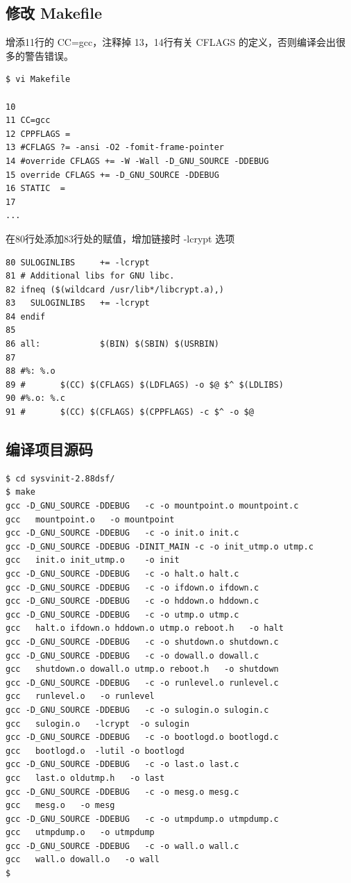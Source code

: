 \subsection{修改 Makefile}

增添11行的 CC=gcc，注释掉 13，14行有关 CFLAGS
的定义，否则编译会出很多的警告错误。

{\begin{shaded}\begin{verbatim}
$ vi Makefile 

10 
11 CC=gcc
12 CPPFLAGS =
13 #CFLAGS ?= -ansi -O2 -fomit-frame-pointer
14 #override CFLAGS += -W -Wall -D_GNU_SOURCE -DDEBUG
15 override CFLAGS += -D_GNU_SOURCE -DDEBUG
16 STATIC  =
17 
...
\end{verbatim}\end{shaded}}
在80行处添加83行处的赋值，增加链接时 -lcrypt 选项

{\begin{shaded}\begin{verbatim}
80 SULOGINLIBS     += -lcrypt
81 # Additional libs for GNU libc.
82 ifneq ($(wildcard /usr/lib*/libcrypt.a),)
83   SULOGINLIBS   += -lcrypt
84 endif
85 
86 all:            $(BIN) $(SBIN) $(USRBIN)
87 
88 #%: %.o
89 #       $(CC) $(CFLAGS) $(LDFLAGS) -o $@ $^ $(LDLIBS)
90 #%.o: %.c
91 #       $(CC) $(CFLAGS) $(CPPFLAGS) -c $^ -o $@
\end{verbatim}\end{shaded}}
\subsection{编译项目源码}

{\begin{shaded}\begin{verbatim}
$ cd sysvinit-2.88dsf/
$ make
gcc -D_GNU_SOURCE -DDEBUG   -c -o mountpoint.o mountpoint.c
gcc   mountpoint.o   -o mountpoint
gcc -D_GNU_SOURCE -DDEBUG   -c -o init.o init.c
gcc -D_GNU_SOURCE -DDEBUG -DINIT_MAIN -c -o init_utmp.o utmp.c
gcc   init.o init_utmp.o    -o init
gcc -D_GNU_SOURCE -DDEBUG   -c -o halt.o halt.c
gcc -D_GNU_SOURCE -DDEBUG   -c -o ifdown.o ifdown.c
gcc -D_GNU_SOURCE -DDEBUG   -c -o hddown.o hddown.c
gcc -D_GNU_SOURCE -DDEBUG   -c -o utmp.o utmp.c
gcc   halt.o ifdown.o hddown.o utmp.o reboot.h   -o halt
gcc -D_GNU_SOURCE -DDEBUG   -c -o shutdown.o shutdown.c
gcc -D_GNU_SOURCE -DDEBUG   -c -o dowall.o dowall.c
gcc   shutdown.o dowall.o utmp.o reboot.h   -o shutdown
gcc -D_GNU_SOURCE -DDEBUG   -c -o runlevel.o runlevel.c
gcc   runlevel.o   -o runlevel
gcc -D_GNU_SOURCE -DDEBUG   -c -o sulogin.o sulogin.c
gcc   sulogin.o   -lcrypt  -o sulogin
gcc -D_GNU_SOURCE -DDEBUG   -c -o bootlogd.o bootlogd.c
gcc   bootlogd.o  -lutil -o bootlogd
gcc -D_GNU_SOURCE -DDEBUG   -c -o last.o last.c
gcc   last.o oldutmp.h   -o last
gcc -D_GNU_SOURCE -DDEBUG   -c -o mesg.o mesg.c
gcc   mesg.o   -o mesg
gcc -D_GNU_SOURCE -DDEBUG   -c -o utmpdump.o utmpdump.c
gcc   utmpdump.o   -o utmpdump
gcc -D_GNU_SOURCE -DDEBUG   -c -o wall.o wall.c
gcc   wall.o dowall.o   -o wall
$ 
\end{verbatim}\end{shaded}}
